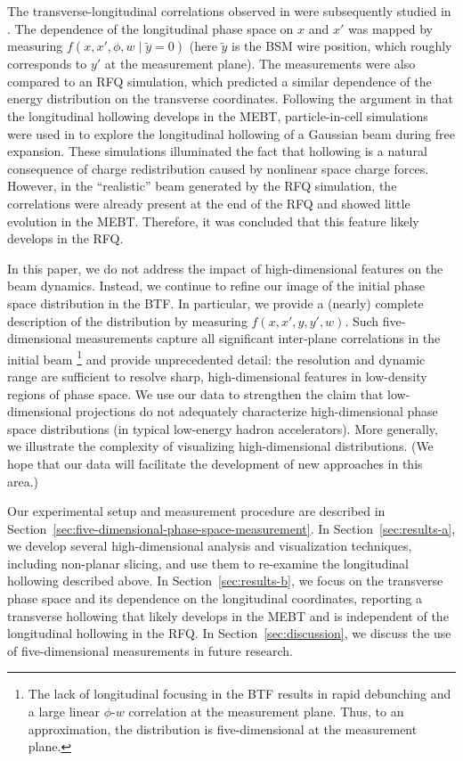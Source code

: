 \documentclass[%
 reprint,
 amsmath,amssymb,
 aps,
prstab,
]{revtex4-2}
\begin{document}
The transverse-longitudinal correlations observed in \cite{Cathey2018} were subsequently studied in \cite{Ruisard2020}. The dependence of the longitudinal phase space on $x$ and $x'$ was mapped by measuring $f(x, x', \phi, w \mid \tilde{y}{=}0)$ (here $\tilde{y}$ is the BSM wire position, which roughly corresponds to $y'$ at the measurement plane). The measurements were also compared to an RFQ simulation, which predicted a similar dependence of the energy distribution on the transverse coordinates. Following the argument in \cite{Cathey2018} that the longitudinal hollowing develops in the MEBT, particle-in-cell simulations were used in \cite{Ruisard2021} to explore the longitudinal hollowing of a Gaussian beam during free expansion. These simulations illuminated the fact that hollowing is a natural consequence of charge redistribution caused by nonlinear space charge forces. However, in the ``realistic'' beam generated by the RFQ simulation, the correlations were already present at the end of the RFQ and showed little evolution in the MEBT. Therefore, it was concluded that this feature likely develops in the RFQ.

In this paper, we do not address the impact of high-dimensional features on the beam dynamics. Instead, we continue to refine our image of the initial phase space distribution in the BTF. In particular, we provide a (nearly) complete description of the distribution by measuring $f(x, x', y, y', w)$. Such five-dimensional measurements capture all significant inter-plane correlations in the initial beam \footnote{The lack of longitudinal focusing in the BTF results in rapid debunching and a large linear $\phi$-$w$ correlation at the measurement plane. Thus, to an approximation, the distribution is five-dimensional at the measurement plane.\label{fn:1}} and provide unprecedented detail: the resolution and dynamic range are sufficient to resolve sharp, high-dimensional features in low-density regions of phase space. We use our data to strengthen the claim that low-dimensional projections do not adequately characterize high-dimensional phase space distributions (in typical low-energy hadron accelerators). More generally, we illustrate the complexity of visualizing high-dimensional distributions. (We hope that our data \cite{Hoover2023_Zenodo} will facilitate the development of new approaches in this area.)

Our experimental setup and measurement procedure are described in Section~\ref{sec:five-dimensional-phase-space-measurement}. In Section~\ref{sec:results-a}, we develop several high-dimensional analysis and visualization techniques, including non-planar slicing, and use them to re-examine the longitudinal hollowing described above. In Section~\ref{sec:results-b}, we focus on the transverse phase space and its dependence on the longitudinal coordinates, reporting a transverse hollowing that likely develops in the MEBT and is independent of the longitudinal hollowing in the RFQ. In Section~\ref{sec:discussion}, we discuss the use of five-dimensional measurements in future research.
\end{document}
